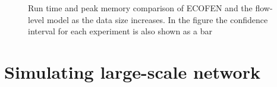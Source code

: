 \begin{figure}[ht]
	\centering
	\centering
	\caption{Run time and peak memory comparison of ECOFEN and the flow-level model as the data size increases. In the figure the confidence interval for each experiment is also shown as a bar}
	\label{fig:scaldata}
\end{figure}
\section{Simulating large-scale network}

